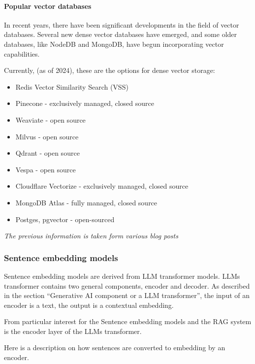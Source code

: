 \documentclass{wseas}
\begin{document}
\paragraph{Popular vector databases}

In recent years, there have been significant developments in the field
of vector databases. Several new dense vector databases have emerged,
and some older databases, like NodeDB and MongoDB, have begun
incorporating vector capabilities.

Currently, (as of 2024), these are the options for dense vector storage:

\begin{itemize}

\item
  Redis Vector Similarity Search (VSS)
\item
  Pinecone - exclusively managed, closed source
\item
  Weaviate - open source
\item
  Milvus - open source
\item
  Qdrant - open source
\item
  Vespa - open source
\item
  Cloudflare Vectorize - exclusively managed, closed source
\item
  MongoDB Atlas - fully managed, closed source
\item
  Postges, pgvector - open-sourced
\end{itemize}

\emph{The previous information is taken form various blog posts} \cite{cite9} \cite{cite10} \cite{cite11} 
\cite{cite12} \cite{cite13} \cite{cite14} \cite{cite15} \cite{cite16}

\subsubsection{Sentence embedding models}

Sentence embedding models are derived from LLM transformer models. LLMs
transformer contains two general components, encoder and decoder. As
described in the section ``Generative AI component or a LLM
transformer'', the input of an encoder is a text, the output is a
contextual embedding.

From particular interest for the Sentence embedding models and the RAG
system is the encoder layer of the LLMs transformer.

Here is a description on how sentences are converted to embedding by an
encoder.
\end{document}
